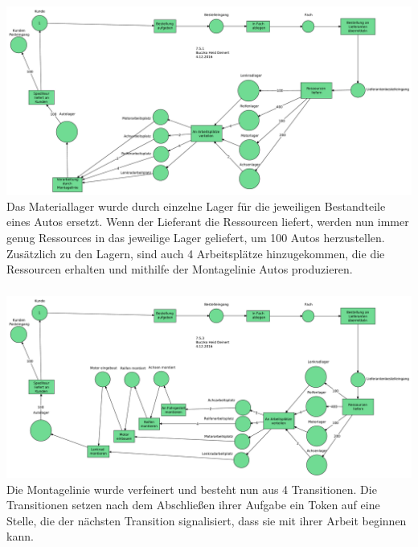 \documentclass[a4paper,12pt]{scrartcl}
\begin{document}
\subsubsection{}
\includegraphics[scale=0.3]{G-6-A-07-Netz3-Buczko_Heid_Deinert.pdf}\\
Das Materiallager wurde durch einzelne Lager für
die jeweiligen Bestandteile eines Autos ersetzt.
Wenn der Lieferant die Ressourcen liefert, werden nun immer
genug Ressources in das jeweilige Lager geliefert, um 100 Autos herzustellen.
Zusätzlich zu den Lagern, sind auch 4 Arbeitsplätze hinzugekommen,
die die Ressourcen erhalten und mithilfe der Montagelinie
Autos produzieren.

\subsubsection{}
\includegraphics[scale=0.3]{G-6-A-07-Netz4-Buczko_Heid_Deinert.pdf}\\
Die Montagelinie wurde verfeinert und besteht nun aus 4 Transitionen.
Die Transitionen setzen nach dem Abschließen ihrer Aufgabe ein Token auf eine Stelle, die der nächsten Transition
signalisiert, dass sie mit ihrer Arbeit beginnen kann.
\end{document}
